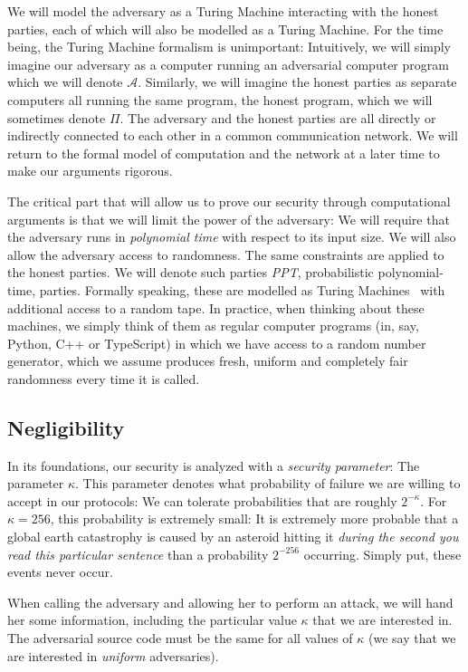 We will model the adversary as a Turing Machine interacting
with the honest parties, each of which will also be modelled as a Turing Machine. For the
time being, the Turing Machine formalism is unimportant: Intuitively, we will simply imagine
our adversary as a computer running an adversarial computer program which we will denote $\mathcal{A}$.
Similarly, we will imagine the honest parties as separate computers all running the same program,
the honest program, which we will sometimes denote $\Pi$.
The adversary and the honest parties are
all directly or indirectly connected to each other in a common communication network.
We will return to the formal model of computation and the network at a later time to make
our arguments rigorous.

The critical part that will allow us to prove our security through computational arguments
is that we will limit the power of the adversary: We will require that the adversary runs
in \emph{polynomial time} with respect to its input size. We will also allow the adversary
access to randomness. The same constraints are applied to the honest parties. We will
denote such parties \emph{PPT}, probabilistic polynomial-time, parties. Formally speaking,
these are modelled as Turing Machines~\cite{turing} with additional access to a random tape.
In practice, when thinking about these machines, we simply think of them as regular computer
programs (in, say, Python, C++ or TypeScript) in which we have access to a random number
generator, which we assume produces fresh, uniform and completely fair randomness every time
it is called.

\subsection*{Negligibility}

In its foundations, our security is analyzed with a \emph{security parameter}:
The parameter
$\kappa$. This parameter denotes what probability of failure we are willing to accept
in our protocols: We can tolerate probabilities that are roughly $2^{-\kappa}$. For
$\kappa = 256$, this probability is extremely small: It is extremely more probable that
a global
earth catastrophy is caused by an asteroid hitting it \emph{during the second you
read this particular sentence} than a probability $2^{-256}$ occurring. Simply put,
these events never occur.

When calling the adversary and allowing her to perform an attack, we will hand her
some information, including the particular value $\kappa$ that we are interested in.
The adversarial source code must be the same for all values of $\kappa$ (we say that we are
interested in \emph{uniform} adversaries).

